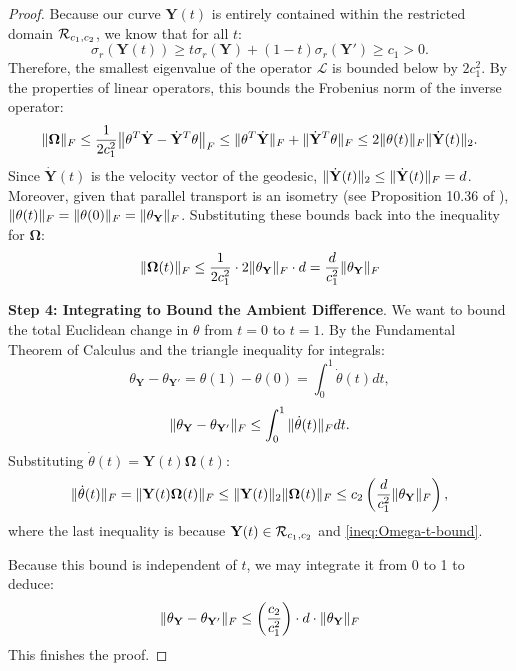\documentclass[11pt]{article}
\newcommand{\0}{{\mathbf{0}}}
\newcommand{\1}{{\mathbf{1}}}
\newcommand{\Y}{{\mathbf{Y}}}
\newcommand{\cR}{{\cal R}}
\newcommand{\bOmega}{\boldsymbol{\Omega}}
\newcommand{\F}{{\rm F}}
\begin{document}
{\begin{proof}
Because our curve $\Y(t)$ is entirely contained within the restricted domain $\cR_{c_1,c_2}$, we know that for all $t$:
\[
\sigma_r(\Y(t)) \geq t\sigma_r(\Y) + (1-t) \sigma_r(\Y') \geq c_1 > 0.
\] 
Therefore, the smallest eigenvalue of the operator $\mathcal{L}$ is bounded below by $2c_1^2$. By the properties of linear operators, this bounds the Frobenius norm of the inverse operator:
\[
\|\bOmega\|_{\F} \le \frac{1}{2c_1^2} \big\| \theta^T \dot{\Y} - \dot{\Y}^T \theta \big\|_{\F} \le \|\theta^T \dot{\Y}\|_{\F} + \|\dot{\Y}^T \theta\|_{\F} \le 2 \|\theta(t)\|_{\F} \|\dot{\Y}(t)\|_2.
\]
Since $\dot{\Y}(t)$ is the velocity vector of the geodesic, $\|\dot{\Y}(t)\|_2 \le \|\dot{\Y}(t)\|_{\F} = d$.
Moreover, given that parallel transport is an isometry (see Proposition 10.36 of \cite{boumal2020introduction}), $\|\theta(t)\|_{\F} = \|\theta(0)\|_{\F} = \|\theta_{\Y}\|_{\F}$. Substituting these bounds back into the inequality for $\bOmega$:
\begin{equation} \label{ineq:Omega-t-bound}
	\|\bOmega(t)\|_{\F} \le \frac{1}{2c_1^2} \cdot 2 \|\theta_{\Y}\|_{\F} \cdot d = \frac{d}{c_1^2} \|\theta_{\Y}\|_{\F}
\end{equation}

{ \noindent \bf  Step 4: Integrating to Bound the Ambient Difference}.
We want to bound the total Euclidean change in $\theta$ from $t=0$ to $t=1$. By the Fundamental Theorem of Calculus and the triangle inequality for integrals:
\[
\theta_{\Y} - \theta_{\Y'} = \theta(1) - \theta(0) = \int_0^1 \dot{\theta}(t) dt,
\]
\[
\|\theta_{\Y} - \theta_{\Y'}\|_{\F} \le \int_0^1 \|\dot{\theta}(t)\|_{\F} dt.
\]
Substituting $\dot{\theta}(t) = \Y(t)\bOmega(t)$:
\[
\|\dot{\theta}(t)\|_{\F} = \|\Y(t)\bOmega(t)\|_{\F} \le \|\Y(t)\|_2 \|\bOmega(t)\|_{\F} \leq  c_2 \left( \frac{d}{c_1^2} \|\theta_{\Y}\|_{\F} \right),
\]
where the last inequality is because $\Y(t) \in \cR_{c_1, c_2}$ and \eqref{ineq:Omega-t-bound}.


Because this bound is independent of $t$, we may integrate it from 0 to 1 to deduce:
\[
\|\theta_{\Y} - \theta_{\Y'}\|_{\F} \le \left( \frac{c_2}{c_1^2} \right) \cdot d \cdot \|\theta_{\Y}\|_{\F}
\]
This finishes the proof.
\end{proof}


}
\end{document}
